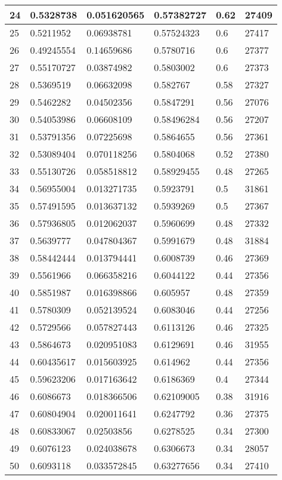 \begin{longtable}{|l|l|l|l|l|l|}
24 & 0.5328738 & 0.051620565 & 0.57382727 & 0.62 & 27409 \\ \hline 
25 & 0.5211952 & 0.06938781 & 0.57524323 & 0.6 & 27417 \\ \hline 
26 & 0.49245554 & 0.14659686 & 0.5780716 & 0.6 & 27377 \\ \hline 
27 & 0.55170727 & 0.03874982 & 0.5803002 & 0.6 & 27373 \\ \hline 
28 & 0.5369519 & 0.06632098 & 0.582767 & 0.58 & 27327 \\ \hline 
29 & 0.5462282 & 0.04502356 & 0.5847291 & 0.56 & 27076 \\ \hline 
30 & 0.54053986 & 0.06608109 & 0.58496284 & 0.56 & 27207 \\ \hline 
31 & 0.53791356 & 0.07225698 & 0.5864655 & 0.56 & 27361 \\ \hline 
32 & 0.53089404 & 0.070118256 & 0.5804068 & 0.52 & 27380 \\ \hline 
33 & 0.55130726 & 0.058518812 & 0.58929455 & 0.48 & 27265 \\ \hline 
34 & 0.56955004 & 0.013271735 & 0.5923791 & 0.5 & 31861 \\ \hline 
35 & 0.57491595 & 0.013637132 & 0.5939269 & 0.5 & 27367 \\ \hline 
36 & 0.57936805 & 0.012062037 & 0.5960699 & 0.48 & 27332 \\ \hline 
37 & 0.5639777 & 0.047804367 & 0.5991679 & 0.48 & 31884 \\ \hline 
38 & 0.58442444 & 0.013794441 & 0.6008739 & 0.46 & 27369 \\ \hline 
39 & 0.5561966 & 0.066358216 & 0.6044122 & 0.44 & 27356 \\ \hline 
40 & 0.5851987 & 0.016398866 & 0.605957 & 0.48 & 27359 \\ \hline 
41 & 0.5780309 & 0.052139524 & 0.6083046 & 0.44 & 27256 \\ \hline 
42 & 0.5729566 & 0.057827443 & 0.6113126 & 0.46 & 27325 \\ \hline 
43 & 0.5864673 & 0.020951083 & 0.6129691 & 0.46 & 31955 \\ \hline 
44 & 0.60435617 & 0.015603925 & 0.614962 & 0.44 & 27356 \\ \hline 
45 & 0.59623206 & 0.017163642 & 0.6186369 & 0.4 & 27344 \\ \hline 
46 & 0.6086673 & 0.018366506 & 0.62109005 & 0.38 & 31916 \\ \hline 
47 & 0.60804904 & 0.020011641 & 0.6247792 & 0.36 & 27375 \\ \hline 
48 & 0.60833067 & 0.02503856 & 0.6278525 & 0.34 & 27300 \\ \hline 
49 & 0.6076123 & 0.024038678 & 0.6306673 & 0.34 & 28057 \\ \hline 
50 & 0.6093118 & 0.033572845 & 0.63277656 & 0.34 & 27410 \\ \hline 
\end{longtable}